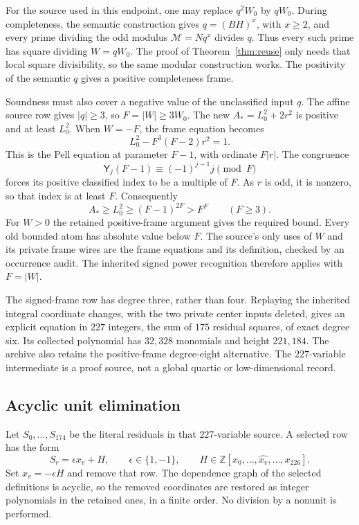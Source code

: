 \documentclass[11pt]{article}
\theoremstyle{remark}
\newcommand{\Z}{\mathbb Z}
\newcommand{\PellY}{\mathsf Y}
\begin{document}
For the source used in this endpoint, one may replace \(q^2W_0\) by
\(qW_0\). During completeness, the semantic construction gives
\(q=(BH)^x\), with \(x\ge2\), and every prime dividing the odd modulus
\(\mathcal M=Nq^x\) divides \(q\). Thus every such prime has square
dividing \(W=qW_0\). The proof of Theorem~\ref{thm:reuse} only needs
that local square divisibility, so the same modular construction works.
The positivity of the semantic \(q\) gives a positive completeness frame.

Soundness must also cover a negative value of the unclassified input \(q\).
The affine source row gives \(|q|\ge3\), so \(F=|W|\ge3W_0\).
The new \(A_*=L_0^2+2r^2\) is positive and at least \(L_0^2\).
When \(W=-F\), the frame equation becomes
\[
 L_0^2-F^3(F-2)r^2=1.
\]
This is the Pell equation at parameter \(F-1\), with ordinate \(F|r|\).
The congruence
\[
 \PellY_j(F-1)\equiv(-1)^{j-1}j\pmod F
\]
forces its positive classified index to be a multiple of \(F\).
As \(r\) is odd, it is nonzero, so that index is at least \(F\).
Consequently
\[
 A_*\ge L_0^2\ge(F-1)^{2F}>F^F\qquad(F\ge3).
\]
For \(W>0\) the retained positive-frame argument gives the required
bound. Every old bounded atom has absolute value below \(F\).
The source's only uses of \(W\) and its private frame wires are the frame
equations and its definition, checked by an occurrence audit.
The inherited signed power recognition therefore applies with \(F=|W|\).

The signed-frame row has degree three, rather than four.
Replaying the inherited integral coordinate changes, with the two private
center inputs deleted, gives an explicit equation in \(227\) integers,
the sum of \(175\) residual squares, of exact degree six.
Its collected polynomial has \(32{,}328\) monomials and height \(221{,}184\).
The archive also retains the positive-frame degree-eight alternative.
The \(227\)-variable intermediate is a proof source, not a global quartic
or low-dimensional record.

\subsection{Acyclic unit elimination}

Let \(S_0,\ldots,S_{174}\) be the literal residuals in that \(227\)-variable
source. A selected row has the form
\[
 S_r=\epsilon x_v+H,\qquad \epsilon\in\{1,-1\},
 \qquad H\in\Z[x_0,\ldots,\widehat{x_v},\ldots,x_{226}].
 \tag{Pivot}
\]
Set \(x_v=-\epsilon H\) and remove that row.
The dependence graph of the selected definitions is acyclic, so the
removed coordinates are restored as integer polynomials in the retained
ones, in a finite order. No division by a nonunit is performed.
\end{document}
